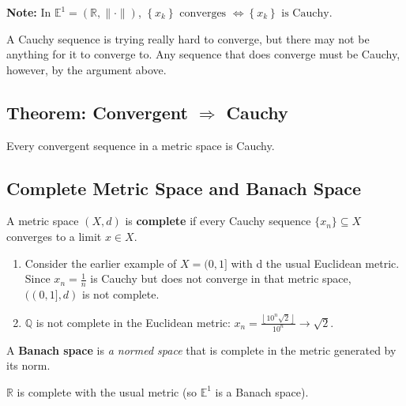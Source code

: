 \documentclass[11pt]{elegantbook}
\begin{document}
\textbf{Note:} In $\mathbb{E}^1=(\mathbb{R},\|\cdot\|)$, $\left\{x_{k}\right\} \text { converges } \Longleftrightarrow\left\{x_{k}\right\} \text { is Cauchy}$.

A Cauchy sequence is trying really hard to converge, but there may not be anything for it to converge to. Any sequence that does converge must be Cauchy, however, by the argument above.

\subsection{Theorem: Convergent $\Rightarrow$ Cauchy}
\begin{theorem}
    Every convergent sequence in a metric space is Cauchy.
\end{theorem}


\subsection{Complete Metric Space and Banach Space}
\begin{definition}
    \normalfont
    A metric space $(X, d)$ is \textbf{complete} if every Cauchy sequence $\{x_n\} \subseteq X$ converges to a limit $x \in X$.
\end{definition}
\begin{example}
    \begin{enumerate}
        \item Consider the earlier example of $X = (0, 1]$ with d the usual Euclidean metric. Since $x_n = \frac{1}{n}$ is Cauchy but does not converge in that metric space, $((0, 1], d)$ is not complete.
        \item $\mathbb{Q}$ is not complete in the Euclidean metric: $x_n=\frac{\left\lfloor 10^n \sqrt{2} \right\rfloor }{10^n} \rightarrow \sqrt{2}$.
    \end{enumerate}
\end{example}

\begin{definition}
    \normalfont
    A \textbf{Banach space} is \textit{a normed space} that is complete in the metric generated by its norm.
\end{definition}

\begin{theorem}
    $\mathbb{R}$ is complete with the usual metric (so $\mathbb{E}^1$ is a Banach space).
\end{theorem}
\end{document}

